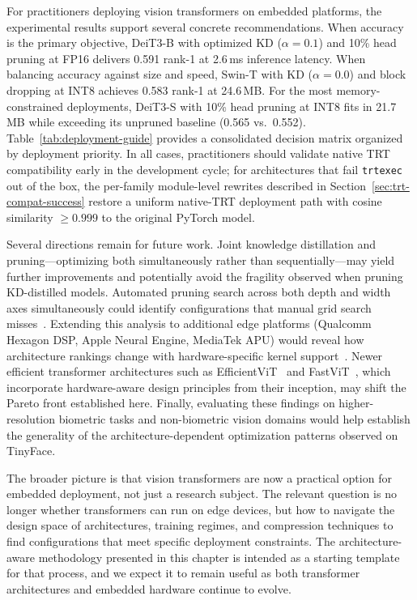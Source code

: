 \documentclass[runningheads,a4paper]{llncs}
\begin{document}
For practitioners deploying vision transformers on embedded platforms, the experimental results support several concrete recommendations. When accuracy is the primary objective, DeiT3-B with optimized KD ($\alpha{=}0.1$) and 10\% head pruning at FP16 delivers 0.591 rank-1 at 2.6\,ms inference latency. When balancing accuracy against size and speed, Swin-T with KD ($\alpha{=}0.0$) and block dropping at INT8 achieves 0.583 rank-1 at 24.6\,MB. For the most memory-constrained deployments, DeiT3-S with 10\% head pruning at INT8 fits in 21.7\,MB while exceeding its unpruned baseline (0.565 vs.\ 0.552). Table~\ref{tab:deployment-guide} provides a consolidated decision matrix organized by deployment priority. In all cases, practitioners should validate native TRT compatibility early in the development cycle; for architectures that fail \texttt{trtexec} out of the box, the per-family module-level rewrites described in Section~\ref{sec:trt-compat-success} restore a uniform native-TRT deployment path with cosine similarity $\geq 0.999$ to the original PyTorch model.

Several directions remain for future work. Joint knowledge distillation and pruning---optimizing both simultaneously rather than sequentially---may yield further improvements and potentially avoid the fragility observed when pruning KD-distilled models. Automated pruning search across both depth and width axes simultaneously could identify configurations that manual grid search misses~\cite{Park2023PTPrune}. Extending this analysis to additional edge platforms (Qualcomm Hexagon DSP, Apple Neural Engine, MediaTek APU) would reveal how architecture rankings change with hardware-specific kernel support~\cite{Ngo2025EdgeInference}. Newer efficient transformer architectures such as EfficientViT~\cite{liu2023efficientvit} and FastViT~\cite{vasu2023fastvit}, which incorporate hardware-aware design principles from their inception, may shift the Pareto front established here. Finally, evaluating these findings on higher-resolution biometric tasks and non-biometric vision domains would help establish the generality of the architecture-dependent optimization patterns observed on TinyFace.

The broader picture is that vision transformers are now a practical option for embedded deployment, not just a research subject. The relevant question is no longer whether transformers can run on edge devices, but how to navigate the design space of architectures, training regimes, and compression techniques to find configurations that meet specific deployment constraints. The architecture-aware methodology presented in this chapter is intended as a starting template for that process, and we expect it to remain useful as both transformer architectures and embedded hardware continue to evolve.


\end{document}
